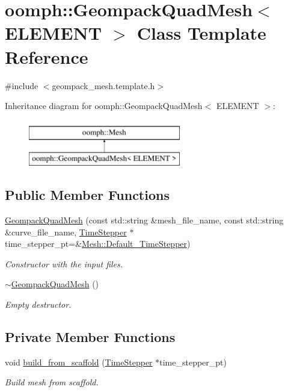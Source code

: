 \hypertarget{classoomph_1_1GeompackQuadMesh}{}\section{oomph\+:\+:Geompack\+Quad\+Mesh$<$ E\+L\+E\+M\+E\+NT $>$ Class Template Reference}
\label{classoomph_1_1GeompackQuadMesh}


{\ttfamily \#include $<$geompack\+\_\+mesh.\+template.\+h$>$}

Inheritance diagram for oomph\+:\+:Geompack\+Quad\+Mesh$<$ E\+L\+E\+M\+E\+NT $>$\+:\begin{figure}[H]
\begin{center}
\leavevmode
\includegraphics[height=2.000000cm]{classoomph_1_1GeompackQuadMesh}
\end{center}
\end{figure}
\subsection*{Public Member Functions}
\begin{DoxyCompactItemize}
\item 
\hyperlink{classoomph_1_1GeompackQuadMesh_aa1de3a1b4fedf1c404d6ed5bbebfb800}{Geompack\+Quad\+Mesh} (const std\+::string \&mesh\+\_\+file\+\_\+name, const std\+::string \&curve\+\_\+file\+\_\+name, \hyperlink{classoomph_1_1TimeStepper}{Time\+Stepper} $\ast$time\+\_\+stepper\+\_\+pt=\&\hyperlink{classoomph_1_1Mesh_a12243d0fee2b1fcee729ee5a4777ea10}{Mesh\+::\+Default\+\_\+\+Time\+Stepper})
\begin{DoxyCompactList}\small\item\em Constructor with the input files. \end{DoxyCompactList}\item 
\hyperlink{classoomph_1_1GeompackQuadMesh_a7795c44ea2da182fbeffa30808481ffb}{$\sim$\+Geompack\+Quad\+Mesh} ()
\begin{DoxyCompactList}\small\item\em Empty destructor. \end{DoxyCompactList}\end{DoxyCompactItemize}
\subsection*{Private Member Functions}
\begin{DoxyCompactItemize}
\item 
void \hyperlink{classoomph_1_1GeompackQuadMesh_a714ee07999e06676f08080bac8c024db}{build\+\_\+from\+\_\+scaffold} (\hyperlink{classoomph_1_1TimeStepper}{Time\+Stepper} $\ast$time\+\_\+stepper\+\_\+pt)
\begin{DoxyCompactList}\small\item\em Build mesh from scaffold. \end{DoxyCompactList}\end{DoxyCompactItemize}
